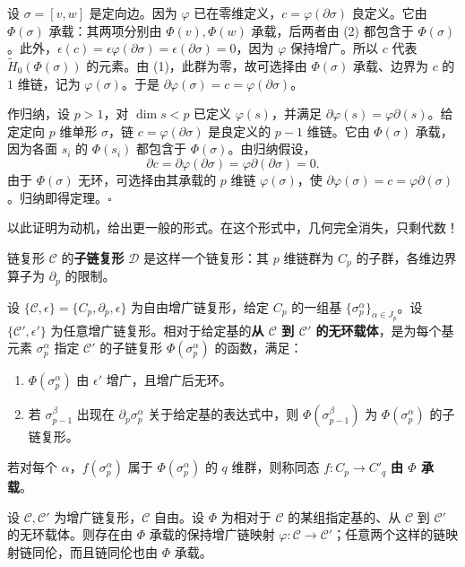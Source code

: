 设 $\sigma=[v,w]$ 是定向边。因为 $\varphi$ 已在零维定义，$c=\varphi(\partial\sigma)$ 良定义。它由 $\Phi(\sigma)$ 承载：其两项分别由 $\Phi(v),\Phi(w)$ 承载，后两者由 (2) 都包含于 $\Phi(\sigma)$。此外，$\epsilon(c)=\epsilon\varphi(\partial\sigma)=\epsilon(\partial\sigma)=0$，因为 $\varphi$ 保持增广。所以 $c$ 代表 $\widetilde H_0(\Phi(\sigma))$ 的元素。由 (1)，此群为零，故可选择由 $\Phi(\sigma)$ 承载、边界为 $c$ 的 $1$ 维链，记为 $\varphi(\sigma)$。于是 $\partial\varphi(\sigma)=c=\varphi(\partial\sigma)$。

作归纳，设 $p>1$，对 $\dim s<p$ 已定义 $\varphi(s)$，并满足 $\partial\varphi(s)=\varphi\partial(s)$。给定定向 $p$ 维单形 $\sigma$，链 $c=\varphi(\partial\sigma)$ 是良定义的 $p-1$ 维链。它由 $\Phi(\sigma)$ 承载，因为各面 $s_i$ 的 $\Phi(s_i)$ 都包含于 $\Phi(\sigma)$。由归纳假设，
\[
\partial c=\partial\varphi(\partial\sigma)=\varphi\partial(\partial\sigma)=0.
\]
由于 $\Phi(\sigma)$ 无环，可选择由其承载的 $p$ 维链 $\varphi(\sigma)$，使 $\partial\varphi(\sigma)=c=\varphi\partial(\sigma)$。归纳即得定理。\hfill$\square$

以此证明为动机，给出更一般的形式。在这个形式中，几何完全消失，只剩代数！

链复形 $\mathcal C$ 的\textbf{子链复形} $\mathcal D$ 是这样一个链复形：其 $p$ 维链群为 $C_p$ 的子群，各维边界算子为 $\partial_p$ 的限制。

设 $\{\mathcal C,\epsilon\}=\{C_p,\partial_p,\epsilon\}$ 为自由增广链复形，给定 $C_p$ 的一组基 $\{\sigma_p^\alpha\}_{\alpha\in J_p}$。设 $\{\mathcal C',\epsilon'\}$ 为任意增广链复形。相对于给定基的\textbf{从 $\mathcal C$ 到 $\mathcal C'$ 的无环载体}，是为每个基元素 $\sigma_p^\alpha$ 指定 $\mathcal C'$ 的子链复形 $\Phi(\sigma_p^\alpha)$ 的函数，满足：
\begin{enumerate}[label=(\arabic*)]
\item $\Phi(\sigma_p^\alpha)$ 由 $\epsilon'$ 增广，且增广后无环。
\item 若 $\sigma_{p-1}^\beta$ 出现在 $\partial_p\sigma_p^\alpha$ 关于给定基的表达式中，则 $\Phi(\sigma_{p-1}^\beta)$ 为 $\Phi(\sigma_p^\alpha)$ 的子链复形。
\end{enumerate}
若对每个 $\alpha$，$f(\sigma_p^\alpha)$ 属于 $\Phi(\sigma_p^\alpha)$ 的 $q$ 维群，则称同态 $f:C_p\to C'_q$ \textbf{由 $\Phi$ 承载}。

设 $\mathcal C,\mathcal C'$ 为增广链复形，$\mathcal C$ 自由。设 $\Phi$ 为相对于 $\mathcal C$ 的某组指定基的、从 $\mathcal C$ 到 $\mathcal C'$ 的无环载体。则存在由 $\Phi$ 承载的保持增广链映射 $\varphi:\mathcal C\to\mathcal C'$；任意两个这样的链映射链同伦，而且链同伦也由 $\Phi$ 承载。

